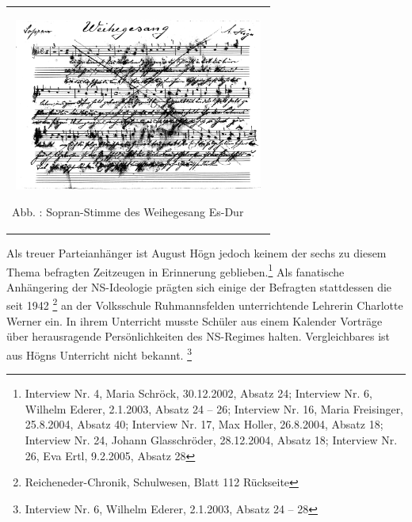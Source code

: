 \begin{center}
\begin{minipage}{8.835cm}
\begin{center}
\tablefirsthead{}
\tablehead{}
\tabletail{}
\tablelasttail{}
\begin{supertabular}{m{8.635cm}}

\includegraphics[width=8.453cm,height=5.678cm]{pictures/zulassungsarbeit-img035.png}

Abb. : Sopran-Stimme des Weihegesang Es-Dur\\
\end{supertabular}
\end{center}
\end{minipage}
\end{center}
Als treuer Parteianhänger ist August Högn jedoch keinem der sechs zu
diesem Thema befragten Zeitzeugen in Erinnerung geblieben.\footnote{
Interview Nr. 4, Maria Schröck, 30.12.2002, Absatz 24; Interview Nr. 6,
Wilhelm Ederer, 2.1.2003, Absatz 24 – 26; Interview Nr. 16, Maria
Freisinger, 25.8.2004, Absatz 40; Interview Nr. 17, Max Holler,
26.8.2004, Absatz 18; Interview Nr. 24, Johann Glasschröder,
28.12.2004, Absatz 18; Interview Nr. 26, Eva Ertl, 9.2.2005, Absatz 28}
Als fanatische Anhängering der NS-Ideologie prägten sich einige der
Befragten stattdessen die seit 1942 \footnote{Reicheneder-Chronik,
Schulwesen, Blatt 112 Rückseite} an der Volksschule Ruhmannsfelden
unterrichtende Lehrerin Charlotte Werner ein. In ihrem Unterricht
musste Schüler aus einem Kalender Vorträge über herausragende
Persönlichkeiten des NS-Regimes halten. Vergleichbares ist aus Högns
Unterricht nicht bekannt. \footnote{Interview Nr. 6, Wilhelm Ederer,
2.1.2003, Absatz 24 – 28}


